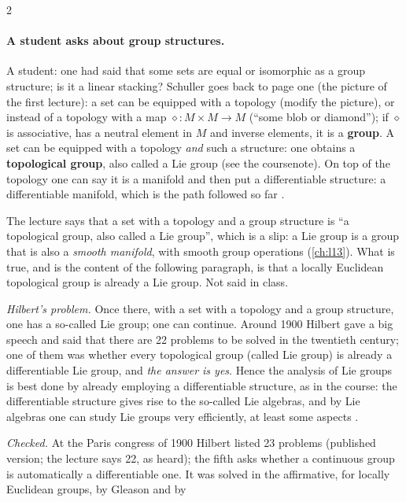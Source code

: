 \begin{paracol}{2}
\paragraph{A student asks about group structures.} A student: one had said that some sets are equal or isomorphic as a group structure; is it a linear stacking? Schuller goes back to page one (the picture of the first lecture): a set can be equipped with a topology (modify the picture), or instead of a topology
with a map $\diamond\colon M\times M\to M$ (``some blob or diamond''); if $\diamond$ is associative, has a neutral element in $M$ and inverse elements, it is a \textbf{group}. A set can be equipped with a topology \emph{and} such a structure: one obtains a \textbf{topological group}, also called a Lie group
(see the coursenote). On top of the topology one can say it is a manifold and then put a differentiable structure: a differentiable manifold, which is the path followed so far .
\begin{coursenote}
The lecture says that a set with a topology and a group structure is ``a topological group, also called a Lie group'', which is a slip: a Lie group is a group that is also a \emph{smooth manifold}, with smooth group operations (\cref{ch:l13}). What is true, and is the content of the following paragraph, is that a
locally Euclidean topological group is already a Lie group. Not said in class.
\end{coursenote}
\emph{Hilbert's problem.} Once there, with a set with a topology and a group structure, one has a so-called Lie group; one can continue. Around 1900 Hilbert gave a big speech and said that there are 22 problems to be solved in the twentieth century; one of them was whether every topological group (called Lie group)
is already a differentiable Lie group, and \emph{the answer is yes}. Hence the analysis of Lie groups is best done by already employing a differentiable structure, as in the course: the differentiable structure gives rise to the so-called Lie algebras, and by Lie algebras one can study Lie groups very efficiently, at least some
aspects .
\begin{history}
\emph{Checked.} At the Paris congress of 1900 Hilbert listed 23 problems (published version; the lecture says 22, as heard); the fifth asks whether a continuous group is automatically a differentiable one. It was solved in the affirmative, for locally Euclidean groups, by Gleason and by

\end{history}
\end{paracol}
